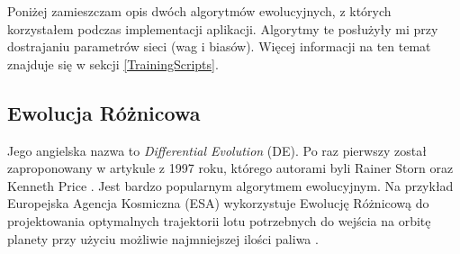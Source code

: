 Poniżej zamieszczam opis dwóch algorytmów ewolucyjnych, z których korzystałem podczas implementacji aplikacji. Algorytmy te posłużyły mi przy dostrajaniu parametrów sieci (wag i biasów). Więcej informacji na ten temat znajduje się w sekcji \ref{TrainingScripts}.

\subsection{Ewolucja Różnicowa}
\label{DeOverview}
Jego angielska nazwa to \textit{Differential Evolution} (DE). Po raz pierwszy został zaproponowany w artykule z 1997 roku, którego autorami byli Rainer Storn oraz Kenneth Price \cite{de:firstArticle}. Jest bardzo popularnym algorytmem ewolucyjnym. Na przykład Europejska Agencja Kosmiczna (ESA) wykorzystuje Ewolucję Różnicową do projektowania optymalnych trajektorii lotu potrzebnych do wejścia na orbitę planety przy użyciu możliwie najmniejszej ilości paliwa \cite{de:esaArticle}.

